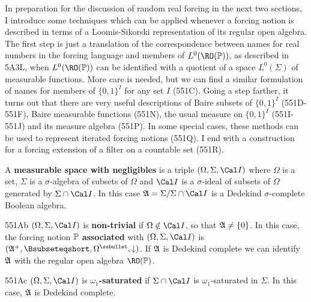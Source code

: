 
\def\chaptername{Possible worlds}
\def\sectionname{Forcing with quotient algebras}

\def\BbbPk{\Bbb P_{\kappa}}
\def\VVdPk{\VVdash_{\Bbb P_{\kappa}}}



In preparation for the discussion of random real forcing in the next two
sections, I
introduce some techniques which can be applied whenever a forcing
notion is described in terms of a Loomis-Sikorski representation of 
its regular
open algebra.   The first step is just a translation of the correspondence
between names for real numbers in the forcing language and members of
$L^0(\RO(\Bbb P))$, as described in 5A3L, when $L^0(\RO(\Bbb P))$ can be
identified with a quotient of a space $L^0(\Sigma)$ of measurable
functions.   More care is needed,
but we can find a similar formulation of names for members
of $\{0,1\}^I$ for any set $I$ (551C).   Going a step farther,
it turns out that there are very useful descriptions
of Baire subsets of $\{0,1\}^I$ (551D-551F), Baire
measurable functions (551N),
the usual measure on $\{0,1\}^I$ (551I-551J) and its measure
algebra (551P).   In some special cases, these methods can be used to
represent iterated forcing notions (551Q).
I end with a construction for a forcing
extension of a filter on a countable set (551R).

 A {\bf measurable space with negligibles} is
a triple $(\Omega,\Sigma,\Cal I)$ where $\Omega$ is a set, $\Sigma$ is a
$\sigma$-algebra of subsets of $\Omega$ and $\Cal I$ is a $\sigma$-ideal of
subsets of $\Omega$ generated by $\Sigma\cap\Cal I$.
In this case $\frak A=\Sigma/\Sigma\cap\Cal I$ is a
Dedekind $\sigma$-complete Boolean algebra.


\spheader 551Ab $(\Omega,\Sigma,\Cal I)$ is
{\bf non-trivial} if $\Omega\notin\Cal I$, so that $\frak A\ne\{0\}$.
In this case, the forcing notion $\Bbb P$
{\bf associated} with $(\Omega,\Sigma,\Cal I)$ is
$(\frak A^+,\Bsubseteqshort,\Omega^{\ssbullet},\downarrow)$.   If $\frak A$ is Dedekind complete we can identify
$\frak A$ with the regular open algebra
$\RO(\Bbb P)$.

\spheader 551Ac $(\Omega,\Sigma,\Cal I)$ is {\bf
$\omega_1$-saturated} if $\Sigma\cap\Cal I$ is $\omega_1$-saturated in
$\Sigma$.
In this case, $\frak A$ is Dedekind complete.

